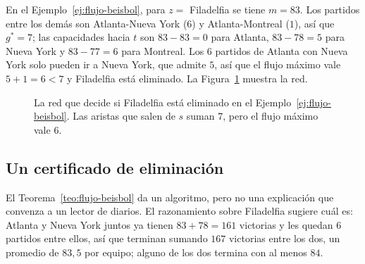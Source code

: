 \documentclass[12pt, spanish, oneside, openany]{book}
\theoremstyle{uprightplain}
\theoremstyle{definition}
\theoremstyle{remark}
\theoremstyle{definition}
\begin{document}
En el Ejemplo~\ref{ej:flujo-beisbol}, para $z=$ Filadelfia se tiene $m=83$. Los partidos entre los demás son Atlanta-Nueva York ($6$) y Atlanta-Montreal ($1$), así que $g^{*}=7$; las capacidades hacia $t$ son $83-83=0$ para Atlanta, $83-78=5$ para Nueva York y $83-77=6$ para Montreal. Los $6$ partidos de Atlanta con Nueva York solo pueden ir a Nueva York, que admite $5$, así que el flujo máximo vale $5+1=6<7$ y Filadelfia está eliminado. La Figura~\ref{fig:flujo-beisbol} muestra la red.

\begin{figure}[H]
\centering
{}
\caption{La red que decide si Filadelfia está eliminado en el
Ejemplo~\ref{ej:flujo-beisbol}. Las aristas que salen de $s$ suman $7$, pero el
flujo máximo vale $6$.}
\label{fig:flujo-beisbol}
\end{figure}

\subsection{Un certificado de eliminación}

El Teorema~\ref{teo:flujo-beisbol} da un algoritmo, pero no una explicación que convenza a un lector de diarios. El razonamiento sobre Filadelfia sugiere cuál es: Atlanta y Nueva York juntos ya tienen $83+78=161$ victorias y les quedan $6$ partidos entre ellos, así que terminan sumando $167$ victorias entre los dos, un promedio de $83{,}5$ por equipo; alguno de los dos termina con al menos $84$.
\end{document}
